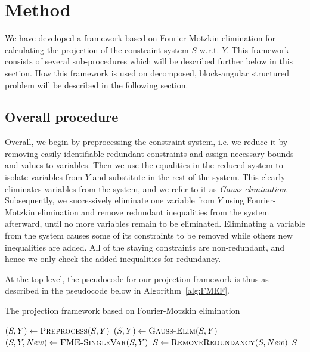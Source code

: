 %
%
\section{Method}
We have developed a framework based on Fourier-Motzkin-elimination for calculating the projection of the constraint system $S$ w.r.t. $Y$. %
This framework consists of several sub-procedures which will be described further below in this section. How this framework is used on decomposed, block-angular structured problem will be described in the following section.

\subsection{Overall procedure}
Overall, we begin by preprocessing the constraint system, i.e. we reduce it by removing easily identifiable redundant constraints and assign necessary bounds and values to variables.
Then we use the equalities in the reduced system to isolate variables from $Y$ and substitute in the rest of the system. This clearly eliminates variables from the system, and we refer to it as \emph{Gauss-elimination}.  
Subsequently, we successively eliminate one variable from $Y$ using Fourier-Motzkin elimination and remove redundant inequalities from the system afterward, until no more variables remain to be eliminated. Eliminating a variable from the system causes some of its constraints to be removed while others new inequalities are added. All of the {staying} constraints are non-redundant, and hence we only check the added inequalities for redundancy. 

At the top-level, the pseudocode for our projection framework is thus as described in the pseudocode below in Algorithm~\ref{alg:FMEF}. 

\begin{algorithm}
\caption{The projection framework based on Fourier-Motzkin elimination} 
\label{alg:FMEF}
\begin{algorithmic}
	\State $(S,Y)\gets \Call{Preprocess}{S,Y}$
	\State $(S,Y)\gets\Call{Gauss-Elim}{S,Y}$
		\State $(S, Y, New )\gets\Call{FME-SingleVar}{S,Y}$
		\State $S\gets\Call{RemoveRedundancy}{S,New}$
	\EndWhile
	\State \Return $S$
\EndFunction
\end{algorithmic}
\end{algorithm}

